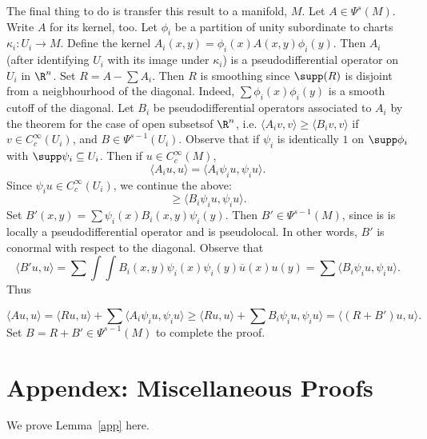\documentclass[12pt]{article}
\begin{document}
The final thing to do is transfer this result to a manifold, $M$.
Let $A \in \Psi^s(M)$. Write $A$ for its kernel, too. Let $\phi_i$ be a partition of unity subordinate to charts $\kappa_i:U_i \to M$. Define the kernel $A_i(x,y) = \phi_i(x)A(x,y)\phi_i(y)$. Then $A_i$ (after identifying $U_i$ with its image under $\kappa_i$) is a pseudodifferential operator on  $U_i$ in $\R^n$. Set $R = A-\sum A_i$. Then $R$ is smoothing since $\supp(R)$ is disjoint from a neigbhourhood of the diagonal. Indeed, $\sum \phi_i(x)\phi_i(y)$ is a smooth cutoff of the diagonal. Let $B_i$ be pseudodifferential operators associated to $A_i$ by the theorem for the case of open subsetsof $\R^n$, i.e. $\langle A_iv,v\rangle \geq \langle B_iv,v\rangle$ if $v \in C_c^\infty(U_i)$, and $B \in \Psi^{s-1}(U_i)$. Observe that if $\psi_i$ is identically $1$ on $\supp \phi_i$ with $\supp \psi_i \subseteq U_i$. Then if $u \in C_c^\infty(M)$,
\[\langle A_iu,u\rangle = \langle A_i\psi_i u,\psi_iu\rangle.\]
Since $\psi_i u \in C_c^\infty(U_i)$, we continue the above:
\[\geq \langle B_i\psi_iu,\psi_i u\rangle.\]
Set $B'(x,y) = \sum \psi_i(x)B_i(x,y)\psi_i(y)$. Then $B' \in \Psi^{s-1}(M)$, since is is locally a pseudodifferential operator and is pseudolocal. In other words, $B'$ is conormal with respect to the diagonal. Observe that
\[\langle B' u,u\rangle = \sum \int\int B_i(x,y)\psi_i(x)\psi_i(y)\overline{u}(x)u(y) = \sum \langle B_i\psi_i u,\psi_i u\rangle.\] Thus

\[\langle Au,u\rangle = \langle Ru,u\rangle + \sum \langle A_i\psi_iu,\psi_iu\rangle \geq \langle Ru,u\rangle + \sum B_i\psi_i u,\psi_i u\rangle = \langle (R+B')u,u\rangle.\]
Set $B = R+B' \in \Psi^{s-1}(M)$ to complete the proof.

\appendix

\section{Appendex: Miscellaneous Proofs}

We prove Lemma~\ref{app} here.
\end{document}
